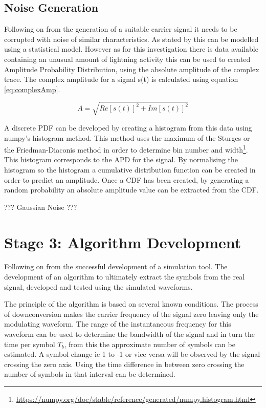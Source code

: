 \subsection{Noise Generation}
Following on from the generation of a suitable carrier signal it needs to be corrupted with noise of similar characteristics. As stated by \cite{Chrissan2000} this can be modelled using a statistical model. However as for this investigation there is data available containing an unusual amount of lightning activity this can be used to created Amplitude Probability Distribution, using the absolute amplitude of the complex trace. The complex amplitude for a signal s(t) is calculated using equation \ref{eq:complexAmp}.

\begin{equation}
    A = \sqrt{Re[s(t)]^2 + Im[s(t)]^2}
    \label{eq:complexAmp}
\end{equation}

A discrete PDF can be developed by creating a histogram from this data using numpy's histogram method. This method uses the maximum of the Sturges or the Friedman-Diaconis method in order to determine bin number and width\footnote{\hyperlink{https://numpy.org/doc/stable/reference/generated/numpy.histogram.html}{https://numpy.org/doc/stable/reference/generated/numpy.histogram.html}}.
This histogram corresponds to the APD for the signal. By normalising the histogram so the histogram a cumulative distribution function can be created in order to predict an amplitude. Once a CDF has been created, by generating a random probability an absolute amplitude value can be extracted from the CDF.

??? Gaussian Noise ???
\section{Stage 3: Algorithm Development}
Following on from the successful development of a simulation tool. The development of an algorithm to ultimately extract the symbols from the real signal, developed and tested using the simulated waveforms.

The principle of the algorithm is based on several known conditions. The process of downconversion makes the carrier frequency of the signal zero leaving only the modulating waveform. The range of the instantaneous frequency for this waveform can be used to determine the bandwidth of the signal and in turn the time per symbol $T_b$, from this the approximate number of symbols can be estimated. A symbol change ie 1 to -1 or vice versa will be observed by the signal crossing the zero axis. Using the time difference in between zero crossing the number of symbols in that interval can be determined. 

